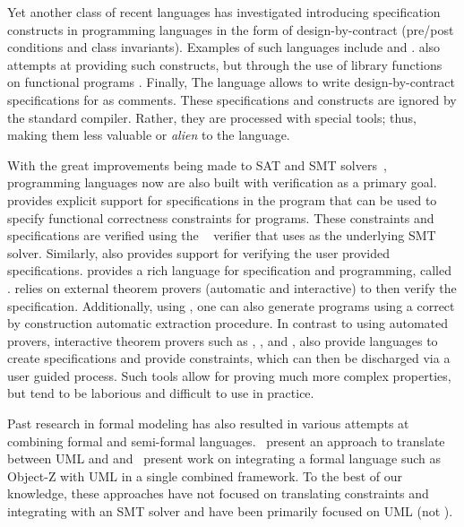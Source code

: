 Yet another class of recent languages has investigated introducing
specification constructs in programming languages in the form of
design-by-contract (pre/post conditions and class
invariants). Examples of such languages include \eiffel{}
\cite{eiffel} and \specsharp{} \cite{specsharp}. \scala{} also
attempts at providing such constructs, but through the use of library
functions on functional programs \cite{odersky-rv10}. Finally, The
\jml{} language \cite{jml} allows to write design-by-contract
specifications for \java{} as comments. These specifications and
constructs are ignored by the standard \java{} compiler. Rather, they
are processed with special tools; thus, making them less valuable or
{\em alien} to the language.

With the great improvements being made to SAT and SMT
solvers~\cite{smt-lib,de2008z3}, programming languages now are also
built with verification as a primary goal. \dafny{}
\cite{leino-lpar-2010} provides explicit support for specifications in
the program that can be used to specify functional correctness
constraints for programs. These constraints and specifications are
verified using the \boogie{}~\cite{barnett2006boogie} verifier that
uses \zthree{} as the underlying SMT solver. Similarly, \specsharp{}
also provides support for verifying the user provided
specifications. \whythree{} \cite{filliatre-why3-2011} provides a rich
language for specification and programming, called
\whyml{}. \whythree{} relies on external theorem provers (automatic
and interactive) to then verify the specification. Additionally, using
\whyml{}, one can also generate \ocaml{} programs using a correct by
construction automatic extraction procedure. In contrast to using
automated provers, interactive theorem provers such as \pvs{}
\cite{cade92-pvs,pvs-website}, \coq{} \cite{coq-website}, and
\isabelle{} \cite{isabelle-website}, also provide languages to create
specifications and provide constraints, which can then be discharged
via a user guided process. Such tools allow for proving much more
complex properties, but tend to be laborious and difficult to use in
practice.

Past research in formal modeling has also resulted in various attempts
at combining formal and semi-formal
languages.~\cite{lausdahl2009connecting} present an approach to
translate between UML and \vdmpp{} and~\cite{kim2005mda} present
work on integrating a formal language such as Object-Z with UML in a
single combined framework. To the best of our knowledge, these
approaches have not focused on translating constraints and integrating
with an SMT solver and have been primarily focused on UML (not
\sysml).

